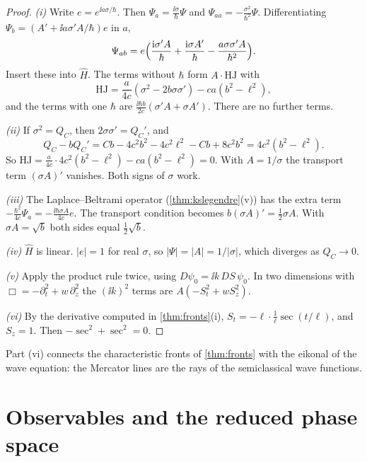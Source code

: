 \begin{proof}
\emph{(i)} Write $e=e^{\ii a\sigma/\hbar}$. Then $\Psi_a=\frac{\ii\sigma}\hbar\Psi$ and $\Psi_{aa}=-\frac{\sigma^2}{\hbar^2}\Psi$. Differentiating $\Psi_b=(A'+\ii a\sigma'A/\hbar)e$ in $a$,
\[
\Psi_{ab}=e\Bigl(\frac{\mathrm{i}\sigma'A}\hbar+\frac{\mathrm{i}\sigma A'}\hbar-\frac{a\sigma\sigma'A}{\hbar^2}\Bigr).
\]
Insert these into $\hat H$. The terms without $\hbar$ form $A\cdot\mathrm{HJ}$ with
\[
\mathrm{HJ}=\frac a{4c}(\sigma^2-2b\sigma\sigma')-ca(b^2-\ell^2),
\]
and the terms with one $\hbar$ are $\frac{\ii\hbar b}{2c}(\sigma'A+\sigma A')$. There are no further terms.

\emph{(ii)} If $\sigma^2=Q_C$, then $2\sigma\sigma'=Q_C'$, and
\[
Q_C-bQ_C'=Cb-4c^2b^2-4c^2\ell^2-Cb+8c^2b^2=4c^2(b^2-\ell^2).
\]
So $\mathrm{HJ}=\frac a{4c}\cdot4c^2(b^2-\ell^2)-ca(b^2-\ell^2)=0$. With $A=1/\sigma$ the transport term $(\sigma A)'$ vanishes. Both signs of $\sigma$ work.

\emph{(iii)} The Laplace--Beltrami operator (\cref{thm:kslegendre}(v)) has the extra term $-\frac{\hbar^2}{4c}\Psi_a=-\frac{\ii\hbar\sigma A}{4c}e$. The transport condition becomes $b(\sigma A)'=\frac12\sigma A$. With $\sigma A=\sqrt b$ both sides equal $\frac12\sqrt b$.

\emph{(iv)} $\hat H$ is linear. $|e|=1$ for real $\sigma$, so $|\Psi|=|A|=1/|\sigma|$, which diverges as $Q_C\to0$.

\emph{(v)} Apply the product rule twice, using $D\psi_0=\ii k\,DS\,\psi_0$. In two dimensions with $\Box=-\partial_t^2+w\,\partial_z^2$ the $(\ii k)^2$ terms are $A(-S_t^2+wS_z^2)$.

\emph{(vi)} By the derivative computed in \cref{thm:fronts}(i), $S_t=-\ell\cdot\frac1\ell\sec(t/\ell)$, and $S_z=1$. Then $-\sec^2+\sec^2=0$.
\end{proof}


Part (vi) connects the characteristic fronts of \cref{thm:fronts} with the eikonal of the wave equation: the Mercator lines are the rays of the semiclassical wave functions.

\section{Observables and the reduced phase space}


